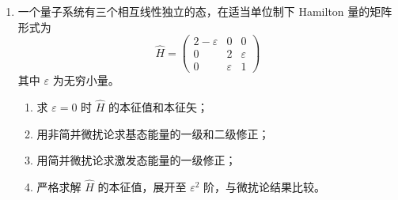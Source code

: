 \begin{enumerate}
{\begin{enumerate}
		\textbf{第一激发态}：一个粒子在 $j=0$，另一个在 $j=1$ 或 $j=N-1$（二者能量相同，$E_1=E_{N-1}=-2\cos(2\pi/N)$）。对称化态为
		\begin{align*}
			|\Psi_{\pm}\rangle=\frac{1}{\sqrt{2}}\left(|k_0\rangle\otimes|k_{\pm 1}\rangle+|k_{\pm 1}\rangle\otimes|k_0\rangle\right)
		\end{align*}
		其中 $k_{\pm 1}=\pm 2\pi/N$。能量为
		\begin{align*}
			E_{\text{1st}}=-2-2\cos\!\left(\frac{2\pi}{N}\right)
		\end{align*}
		简并度为 2（对应 $j=1$ 和 $j=N-1$ 两种选择）。

		注：$N=2$ 时 $j=1$ 即 $j=N-1$，第一激发态简并度为 1。
	\end{enumerate}
	}

	\item
	一个量子系统有三个相互线性独立的态，在适当单位制下 Hamilton 量的矩阵形式为
	\[
	\hat{H}=\begin{pmatrix}2-\varepsilon&0&0\\0&2&\varepsilon\\0&\varepsilon&1\end{pmatrix}
	\]
	其中 $\varepsilon$ 为无穷小量。
	\begin{enumerate}
		\item 求 $\varepsilon=0$ 时 $\hat{H}$ 的本征值和本征矢；
		\item 用非简并微扰论求基态能量的一级和二级修正；
		\item 用简并微扰论求激发态能量的一级修正；
		\item 严格求解 $\hat{H}$ 的本征值，展开至 $\varepsilon^2$ 阶，与微扰论结果比较。
	\end{enumerate}

\end{enumerate}
